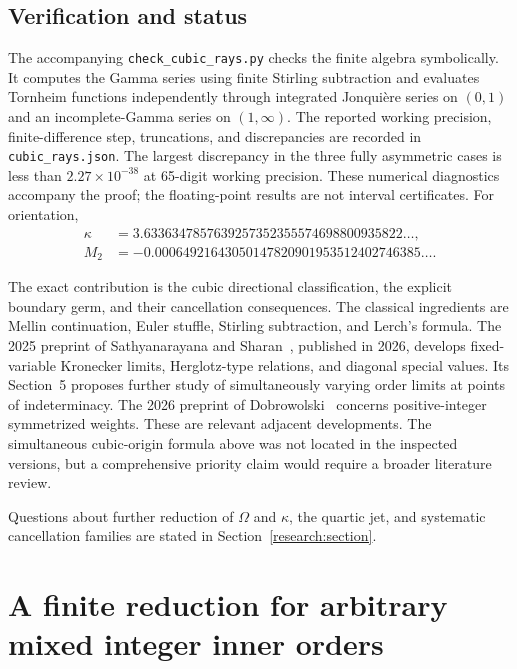 \documentclass[11pt]{article}
\numberwithin{equation}{section}
\theoremstyle{plain}
\theoremstyle{definition}
\theoremstyle{remark}
\begin{document}
\subsection{Verification and status}

The accompanying \texttt{check\_cubic\_rays.py} checks the finite algebra
symbolically.  It computes the Gamma series using finite Stirling
subtraction and evaluates Tornheim functions independently through
integrated Jonqui\`ere series on $(0,1)$ and an incomplete-Gamma series
on $(1,\infty)$.  The reported working precision, finite-difference
step, truncations, and discrepancies are recorded in
\texttt{cubic\_rays.json}.  The largest discrepancy in the three fully asymmetric cases is less than
$2.27\times10^{-38}$ at 65-digit working precision.  These numerical
diagnostics accompany the proof; the floating-point results are not interval certificates.
For orientation,
\begin{align*}
 \kappa&=3.6336347857639257352355574698800935822\ldots,\\
 M_2&=-0.00064921643050147820901953512402746385\ldots.
\end{align*}

The exact contribution is the cubic directional classification,
the explicit boundary germ, and their cancellation consequences.
The classical ingredients are Mellin continuation, Euler stuffle,
Stirling subtraction, and Lerch's formula.  The 2025 preprint of
Sathyanarayana and Sharan~\cite{tr3:SS}, published in 2026, develops fixed-variable
Kronecker limits, Herglotz-type relations, and diagonal special values.
Its Section~5 proposes further study of simultaneously varying order
limits at points of indeterminacy.  The 2026 preprint of
Dobrowolski~\cite{tr3:Dobrowolski} concerns positive-integer symmetrized weights.  These are
relevant adjacent developments.  The simultaneous cubic-origin formula
above was not located in the inspected versions, but a comprehensive
priority claim would require a broader literature review.

Questions about further reduction of $\Omega$ and $\kappa$, the quartic
jet, and systematic cancellation families are stated in
Section~\ref{research:section}.



\section{A finite reduction for arbitrary mixed integer inner orders}
\label{mixed:section}
\end{document}
